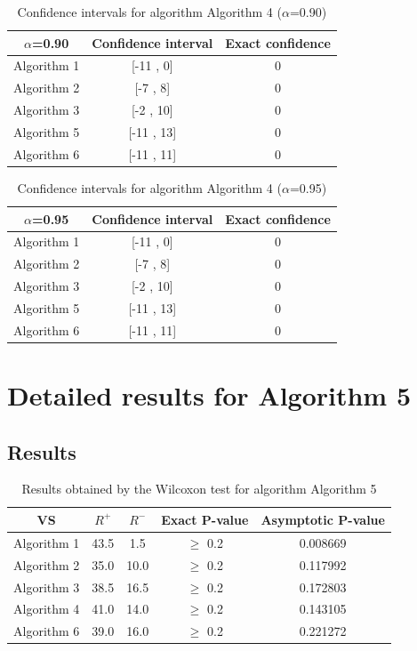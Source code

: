 \documentclass[a4paper,10pt]{article}
\begin{document}
\begin{table}[!htp]
\centering\small
\begin{tabular}{
|c|c|c|}
\hline
 $\alpha$=0.90 & Confidence interval & Exact confidence \\ \hline 
Algorithm 1 & [-11 , 0] & 0\\ \hline 
Algorithm 2 & [-7 , 8] & 0\\ \hline 
Algorithm 3 & [-2 , 10] & 0\\ \hline 
Algorithm 5 & [-11 , 13] & 0\\ \hline 
Algorithm 6 & [-11 , 11] & 0\\ \hline 

\end{tabular}
\caption{Confidence intervals for algorithm Algorithm 4 ($\alpha$=0.90)}
\end{table}
\begin{table}[!htp]
\centering\small
\begin{tabular}{
|c|c|c|}
\hline
 $\alpha$=0.95 & Confidence interval & Exact confidence \\ \hline 
Algorithm 1 & [-11 , 0] & 0\\ \hline 
Algorithm 2 & [-7 , 8] & 0\\ \hline 
Algorithm 3 & [-2 , 10] & 0\\ \hline 
Algorithm 5 & [-11 , 13] & 0\\ \hline 
Algorithm 6 & [-11 , 11] & 0\\ \hline 

\end{tabular}
\caption{Confidence intervals for algorithm Algorithm 4 ($\alpha$=0.95)}
\end{table}

 \clearpage 


\section{Detailed results for Algorithm 5}


\subsection{Results}

\begin{table}[!htp]
\centering\small
\begin{tabular}{
|c|c|c|c|c|}
\hline
 VS & $R^{+}$ & $R^{-}$ & Exact P-value & Asymptotic P-value \\ \hline 
Algorithm 1 & 43.5 & 1.5 & $\geq$ 0.2 & 0.008669\\ \hline 
Algorithm 2 & 35.0 & 10.0 & $\geq$ 0.2 & 0.117992\\ \hline 
Algorithm 3 & 38.5 & 16.5 & $\geq$ 0.2 & 0.172803\\ \hline 
Algorithm 4 & 41.0 & 14.0 & $\geq$ 0.2 & 0.143105\\ \hline 
Algorithm 6 & 39.0 & 16.0 & $\geq$ 0.2 & 0.221272\\ \hline 

\end{tabular}
\caption{Results obtained by the Wilcoxon test for algorithm Algorithm 5}
\end{table}
\end{document}
